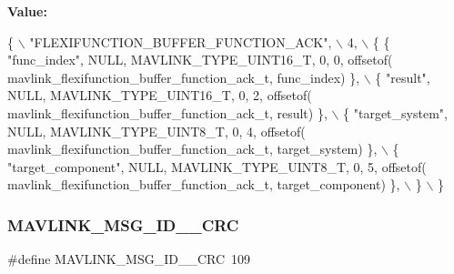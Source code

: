 {\bfseries Value\+:}
\begin{DoxyCode}
\{ \(\backslash\)
    \textcolor{stringliteral}{"FLEXIFUNCTION\_BUFFER\_FUNCTION\_ACK"}, \(\backslash\)
    4, \(\backslash\)
    \{  \{ \textcolor{stringliteral}{"func\_index"}, NULL, MAVLINK_TYPE_UINT16_T, 0, 0, offsetof(
      mavlink_flexifunction_buffer_function_ack_t, func\_index) \}, \(\backslash\)
         \{ \textcolor{stringliteral}{"result"}, NULL, MAVLINK_TYPE_UINT16_T, 0, 2, offsetof(
      mavlink_flexifunction_buffer_function_ack_t, result) \}, \(\backslash\)
         \{ \textcolor{stringliteral}{"target\_system"}, NULL, MAVLINK_TYPE_UINT8_T, 0, 4, offsetof(
      mavlink_flexifunction_buffer_function_ack_t, target\_system) \}, \(\backslash\)
         \{ \textcolor{stringliteral}{"target\_component"}, NULL, MAVLINK_TYPE_UINT8_T, 0, 5, offsetof(
      mavlink_flexifunction_buffer_function_ack_t, target\_component) \}, \(\backslash\)
         \} \(\backslash\)
\}
\end{DoxyCode}
\mbox{\label{mavlink__msg__flexifunction__buffer__function__ack_8h_ac3227f8e78076072e6d3ec10c32559a6}} 
\subsubsection{M\+A\+V\+L\+I\+N\+K\+\_\+\+M\+S\+G\+\_\+\+I\+D\+\_\+\_\+\+C\+RC}
{\footnotesize\ttfamily \#define M\+A\+V\+L\+I\+N\+K\+\_\+\+M\+S\+G\+\_\+\+I\+D\+\_\+\_\+\+C\+RC~109}

\mbox{\label{mavlink__msg__flexifunction__buffer__function__ack_8h_ace4521b3cba704f924cdc61491981441}} 
